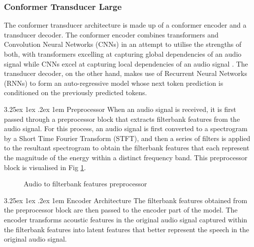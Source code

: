 \documentclass{CSSRforAfrica}
\makeatletter
\renewcommand\paragraph{\@startsection{paragraph}{4}{0pt}%
  {3.25ex \@plus1ex \@minus.2ex}%
  {1em}%
  {\normalfont\normalsize\itshape}}
\makeatother
\begin{document}
\subsubsection{Conformer Transducer Large}
The conformer transducer architecture is made up of a conformer encoder and a transducer decoder. The conformer encoder combines transformers and Convolution Neural Networks (CNNs) in an attempt to utilise the strengths of both, with transformers excelling at capturing global dependencies of an audio signal while CNNs excel at capturing local dependencies of an audio signal \cite{gulati_conformer_2020}. The transducer decoder, on the other hand, makes use of Recurrent Neural Networks (RNNs) to form an auto-regressive model whose next token prediction is conditioned on the previously predicted tokens.

\paragraph{Preprocessor}
When an audio signal is received, it is first passed through a preprocessor block that extracts filterbank features from the audio signal. For this process, an audio signal is first converted to a spectrogram by a Short Time Fourier Transform (STFT), and then a series of filters is applied to the resultant spectrogram to obtain the filterbank features that each represent the magnitude of the energy within a distinct frequency band. This preprocessor block is visualised in Fig \ref{fig:preprocessor}.

\begin{figure}[thb]
\begin{center}
\end{center}
\caption{Audio to filterbank features preprocessor}
\label{fig:preprocessor}
\end{figure}

\newpage
\paragraph{Encoder Architecture}
The filterbank features obtained from the preprocessor block are then passed to the encoder part of the model. The encoder transforms acoustic features in the original audio signal captured within the filterbank features into latent features that better represent the speech in the original audio signal.
\end{document}
